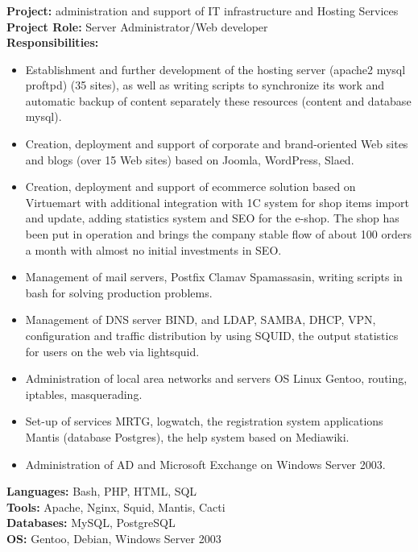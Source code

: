 \documentclass[letterpaper]{article}
\begin{document}
\subsubsection{}
\label{sec-2-2-1}
\textbf{Project:} administration and support of IT infrastructure and Hosting Services\\
\textbf{Project Role:}  Server Administrator/Web developer\\
\textbf{Responsibilities:}\\
\begin{itemize}
\item Establishment and further development of the hosting server (apache2 mysql proftpd) (35 sites), as well as writing scripts to synchronize its work and automatic backup of content separately these resources (content and database mysql).
\item Creation, deployment and support of corporate and brand-oriented Web sites and blogs (over 15 Web sites) based on Joomla, WordPress, Slaed.
\item Creation, deployment and support of ecommerce solution based on Virtuemart with additional integration with 1C system for shop items import and update, adding statistics system and SEO for the e-shop. The shop has been put in operation and brings the company stable flow of about 100 orders a month with almost no initial investments in SEO.
\item Management of mail servers, Postfix Clamav Spamassasin, writing scripts in bash for solving production problems.
\item Management of DNS server BIND, and LDAP, SAMBA, DHCP, VPN, configuration and traffic distribution by using SQUID, the output statistics for users on the web via lightsquid.
\item Administration of local area networks and servers OS Linux Gentoo, routing, iptables, masquerading.
\item Set-up of services MRTG, logwatch, the registration system applications Mantis (database Postgres), the help system based on Mediawiki.
\item Administration of AD and Microsoft Exchange on Windows Server 2003.
\end{itemize}
\textbf{Languages:} Bash, PHP,  HTML, SQL\\
\textbf{Tools:}  Apache, Nginx, Squid, Mantis, Cacti\\
\textbf{Databases:} MySQL, PostgreSQL\\
\textbf{OS:} Gentoo, Debian, Windows Server 2003\\
\end{document}
